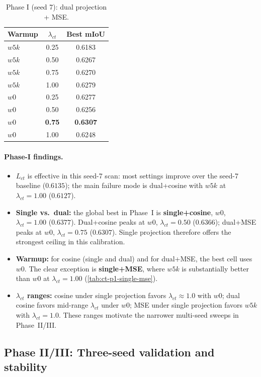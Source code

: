 \begin{table}[t]
\centering
\caption{Phase I (seed 7): dual projection + MSE.}
\label{tab:ct-p1-dual-mse}
\begin{tabular}{lcc}
\toprule
Warmup & $\lambda_{ct}$ & Best mIoU \\
\midrule
$w5k$ & 0.25 & 0.6183 \\
$w5k$ & 0.50 & 0.6267 \\
$w5k$ & 0.75 & 0.6270 \\
$w5k$ & 1.00 & 0.6279 \\
$w0$  & 0.25 & 0.6277 \\
$w0$  & 0.50 & 0.6256 \\
$w0$  & \textbf{0.75} & \textbf{0.6307} \\
$w0$  & 1.00 & 0.6248 \\
\bottomrule
\end{tabular}
\end{table}

\paragraph{Phase-I findings.}
\begin{itemize}
\item $L_{ct}$ is effective in this seed-7 scan: most settings improve over the seed-7 baseline ($0.6135$); the main failure mode is dual+cosine with $w5k$ at $\lambda_{ct}=1.00$ ($0.6127$).
\item \textbf{Single vs.\ dual:} the global best in Phase~I is \textbf{single+cosine}, $w0$, $\lambda_{ct}=1.00$ ($0.6377$). Dual+cosine peaks at $w0$, $\lambda_{ct}=0.50$ ($0.6366$); dual+MSE peaks at $w0$, $\lambda_{ct}=0.75$ ($0.6307$). Single projection therefore offers the strongest ceiling in this calibration.
\item \textbf{Warmup:} for cosine (single and dual) and for dual+MSE, the best cell uses \textbf{$w0$}. The clear exception is \textbf{single+MSE}, where $w5k$ is substantially better than $w0$ at $\lambda_{ct}=1.00$ (\autoref{tab:ct-p1-single-mse}).
\item \textbf{$\lambda_{ct}$ ranges:} cosine under single projection favors $\lambda_{ct}\approx1.0$ with $w0$; dual cosine favors mid-range $\lambda_{ct}$ under $w0$; MSE under single projection favors $w5k$ with $\lambda_{ct}=1.0$. These ranges motivate the narrower multi-seed sweeps in Phase~II/III.
\end{itemize}

\subsection{Phase II/III: Three-seed validation and stability}
\label{subsec:ct-phase23-3seeds}

